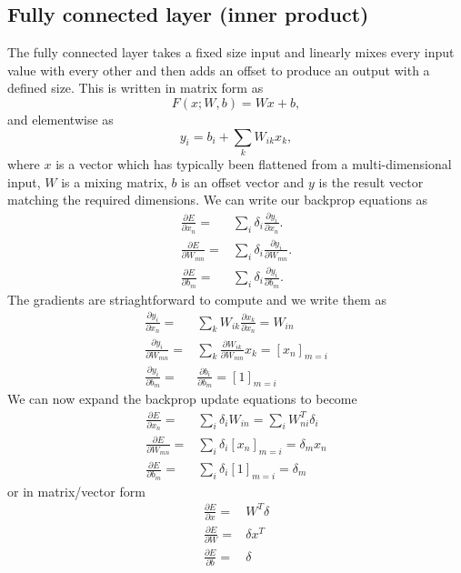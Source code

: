 \documentclass[a4paper]{article}
\begin{document}
\subsection{Fully connected layer (inner product)}
The fully connected layer takes a fixed size input and linearly mixes every input value with every other and then adds an offset to produce an output with a defined size. This is written in matrix form as
\begin{equation}
F(x;W,b)=Wx +b,
\end{equation}
and elementwise as
\begin{equation}
y_{i}=b_i+\sum_k W_{ik}x_{k},
\end{equation}
where $x$ is a vector which has typically been flattened from a multi-dimensional input, $W$ is a mixing matrix, $b$ is an offset vector and $y$ is the result vector matching the required dimensions. We can write our backprop equations as 
\begin{align}
\frac{\partial{E}}{\partial{x_{n}}} = &\sum_{i}\delta_{i} \frac{\partial{y_{i}}}{\partial{x_{n}}}. \\ 
\frac{\partial{E}}{\partial{W_{mn}}} = &\sum_{i}\delta_{i} \frac{\partial{y_{i}}}{\partial{W_{mn}}}. \\
\frac{\partial{E}}{\partial{b_{m}}} = &\sum_{i}\delta_{i} \frac{\partial{y_{i}}}{\partial{b_{m}}}. 
\end{align}
The gradients are striaghtforward to compute and we write them as
\begin{align}
\frac{\partial{y_i}}{\partial{x_{n}}}  = &\sum_{k} W_{ik}\frac{\partial{x_{k}}}{\partial{x_{n}}} = W_{in} \\
\frac{\partial{y_i}}{\partial{W_{mn}}} = &\sum_{k} \frac{\partial{W_{ik}}}{\partial{W_{mn}}} x_k=\left [ x_n \right]_{m=i} \\
\frac{\partial{y_i}}{\partial{b_{m}}}  = &\frac{\partial{b_{i}}}{\partial{b_{m}}}= \left [1 \right]_{m=i}  
\end{align}
We can now expand the backprop update equations to become
\begin{align}
\frac{\partial{E}}{\partial{x_{n}}} = &\sum_{i}\delta_{i} W_{in} = \sum_{i} W^T_{ni}\delta_{i} \\ 
\frac{\partial{E}}{\partial{W_{mn}}} = &\sum_{i}\delta_{i} \left [ x_n \right]_{m=i} = \delta_m x_n\\
\frac{\partial{E}}{\partial{b_{m}}} = &\sum_{i}\delta_{i} \left [1 \right]_{m=i} = \delta_m
\end{align}
or in matrix/vector form
\begin{align}
\frac{\partial{E}}{\partial{x}} = &W^T\delta\\ 
\frac{\partial{E}}{\partial{W}} = &\delta x^T\\
\frac{\partial{E}}{\partial{b}} = &\delta
\end{align}
\end{document}
